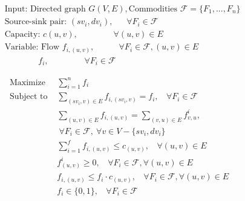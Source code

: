 \documentclass[conference]{IEEEtran}
\begin{document}
\begin{equation} \nonumber
\begin{aligned}
&\text{Input: Directed graph } G(V, E), \text{Commodities } \mathcal{F} = \{F_1, ..., F_n\} \\ \nonumber
&\text{Source-sink~pair: }(sv_i, dv_i),~~~~~~~ \forall F_i \in \mathcal{F} \\ \nonumber
&\text{Capacity: }c(u, v),~~~~~~~~~~~~~~~~~~~ \forall (u, v)\in E \\ \nonumber
&\text{Variable: Flow } f_{i, (u, v)},~~~~~~~~~~~~~ \forall F_i \in \mathcal{F}, (u, v) \in E \\ \nonumber
&~~~~~~~~~~~~~~~~~~f_i, ~~~~~~~~~~~~~~~~~~~\forall F_i \in \mathcal{F}  \nonumber
\end{aligned}
\end{equation}

\begin{equation} \nonumber
\begin{aligned}
\text{Maximize } &\sum_{i=1}^{n}f_i \\  \nonumber
\text{Subject to } &\sum_{(sv_i,v) \in E}f_{i, (sv_i,v)} = f_i,~~~~ \forall F_i \in \mathcal{F} \\ \nonumber
&\sum_{(u, v) \in E}f_{i,(u, v)} = \sum_{(v, u) \in E}f_{v, u}^i, \\ &~\forall F_i \in \mathcal{F}, ~ \forall v \in V - \{sv_i,dv_i\} \\  \nonumber
&\sum_{i=1}^{f}f_{i,(u, v)} \leq c_{(u, v)},~~~~ \forall (u, v) \in E \\ \nonumber
&f_{(u, v)}^i \geq 0,~~~~ \forall F_i \in \mathcal{F},  \forall (u, v) \in E \\ \nonumber
&f_{i,(u, v)} \leq f_i \cdot c_{(u, v)},~~~~ \forall F_i \in \mathcal{F},  \forall (u, v) \in E \\ \nonumber
&f_i \in \{0, 1\},~~~~ \forall F_i \in \mathcal{F} \nonumber
\end{aligned}
\end{equation}
\end{document}
